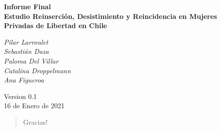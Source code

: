 \documentclass[11pt]{report}
\begin{document}

\thispagestyle{empty}

\renewcommand{\baselinestretch}{1}

\vspace*{60pt}

\begin{center}
\LARGE \textbf{Informe Final}\\
\vspace*{6pt}
\LARGE \textbf{Estudio Reinserción, Desistimiento y Reincidencia en Mujeres Privadas de Libertad en Chile} \\
\vspace*{24pt}

\vspace*{36pt}
\begin{center}
\large
\emph{Pilar Larroulet} \\
\emph{Sebastián Daza} \\
\emph{Paloma Del Villar} \\
\emph{Catalina Droppelmann} \\
\emph{Ana Figueroa} \\
\end{center}

\end{center}

\begin{center}
\normalsize



\vspace{100pt}
Version 0.1\\
16 de Enero de 2021
\end{center}

\setcounter{page}{1}

\renewcommand{\abstractname}{Agradecimientos}
\begin{abstract}

\setlength\parskip{11pt}
Gracias!
\end{abstract}

\newpage
\tableofcontents
\newpage
\listoftables
\newpage
\listoffigures

\newpage
\end{document}
